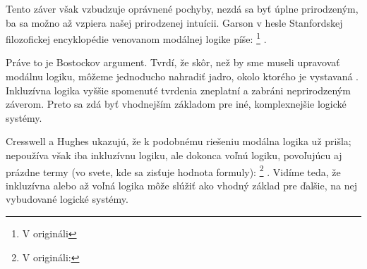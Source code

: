 \documentclass[12pt, letterpaper]{article}
\begin{document}
Tento záver však vzbudzuje oprávnené pochyby, nezdá sa byť úplne prirodzeným, ba sa možno až vzpiera našej prirodzenej intuícii. Garson v hesle Stanfordskej filozofickej encyklopédie venovanom modálnej logike píše: \footnote{V origináli } \parencites[vlastný preklad][]{sep-logic-modal}.\par 
Práve to je Bostockov argument. Tvrdí, že skôr, než by sme museli upravovať modálnu logiku, môžeme jednoducho nahradiť jadro, okolo ktorého je vystavaná \parencites[354--355]{bostock_intermediate_1997}. Inkluzívna logika vyššie spomenuté tvrdenia zneplatní a zabráni neprirodzeným záverom. Preto sa zdá byť vhodnejším základom pre iné, komplexnejšie logické systémy.  



Cresswell a Hughes ukazujú, že k podobnému riešeniu modálna logika už prišla; nepoužíva však iba inkluzívnu logiku, ale dokonca voľnú logiku, povoľujúcu aj prázdne termy (vo svete, kde sa zisťuje hodnota formuly): \footnote{V origináli: } \parencites[vlastný preklad,][293]{Cresswell}. Vidíme teda, že inkluzívna alebo až voľná logika môže slúžiť ako vhodný základ pre ďalšie, na nej vybudované logické systémy.
\end{document}
